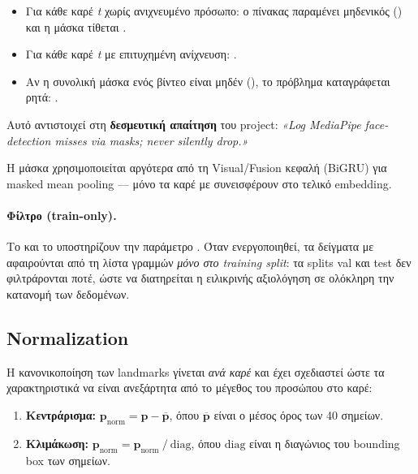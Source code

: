 \begin{itemize}
  \item Για κάθε καρέ \emph{t} χωρίς ανιχνευμένο πρόσωπο:
    ο πίνακας  παραμένει μηδενικός ()
    και η μάσκα τίθεται .
  \item Για κάθε καρέ \emph{t} με επιτυχημένη ανίχνευση:
    .
  \item Αν η συνολική μάσκα ενός βίντεο είναι μηδέν
    (), το πρόβλημα καταγράφεται ρητά:
    .
\end{itemize}

Αυτό αντιστοιχεί στη \textbf{δεσμευτική απαίτηση} του project:
\emph{«Log MediaPipe face-detection misses via masks; never silently drop.»}

Η μάσκα χρησιμοποιείται αργότερα από τη Visual/Fusion κεφαλή (BiGRU) για
masked mean pooling — μόνο τα καρέ με  συνεισφέρουν στο
τελικό embedding.

\paragraph{Φίλτρο  (train-only).}
Το  και το 
υποστηρίζουν την παράμετρο .
Όταν ενεργοποιηθεί, τα δείγματα με  αφαιρούνται
από τη λίστα γραμμών \emph{μόνο στο training split}: τα splits
val και test δεν φιλτράρονται ποτέ, ώστε να διατηρείται η ειλικρινής
αξιολόγηση σε ολόκληρη την κατανομή των δεδομένων.

\subsection{Normalization}
\label{subsec:lip-normalization}

Η κανονικοποίηση των landmarks γίνεται \emph{ανά καρέ} και έχει σχεδιαστεί
ώστε τα χαρακτηριστικά να είναι ανεξάρτητα από το μέγεθος του προσώπου
στο καρέ:

\begin{enumerate}
  \item \textbf{Κεντράρισμα:}
    $\mathbf{p}_{\mathrm{norm}} = \mathbf{p} - \overline{\mathbf{p}}$,
    όπου $\overline{\mathbf{p}}$ είναι ο μέσος όρος των 40 σημείων.
  \item \textbf{Κλιμάκωση:}
    $\mathbf{p}_{\mathrm{norm}} = \mathbf{p}_{\mathrm{norm}} \mathbin{/} \mathrm{diag}$,
    όπου $\mathrm{diag}$ είναι η διαγώνιος του bounding box των σημείων.
\end{enumerate}

